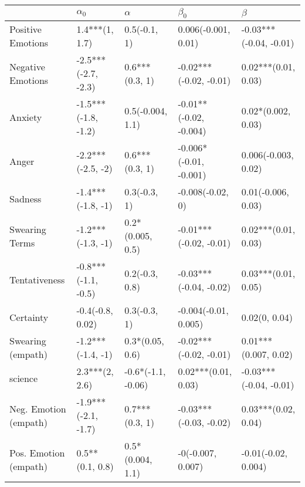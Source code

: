 \begin{tabular}{lllll}
\toprule
{} &           $\alpha_0$ &            $\alpha$ &               $\beta_0$ &                 $\beta$ \\
\midrule
Positive Emotions     &       1.4***(1, 1.7) &        0.5(-0.1, 1) &     0.006(-0.001, 0.01) &  -0.03***(-0.04, -0.01) \\
Negative Emotions     &  -2.5***(-2.7, -2.3) &      0.6***(0.3, 1) &  -0.02***(-0.02, -0.01) &     0.02***(0.01, 0.03) \\
Anxiety               &  -1.5***(-1.8, -1.2) &    0.5(-0.004, 1.1) &  -0.01**(-0.02, -0.004) &      0.02*(0.002, 0.03) \\
Anger                 &    -2.2***(-2.5, -2) &      0.6***(0.3, 1) &  -0.006*(-0.01, -0.001) &     0.006(-0.003, 0.02) \\
Sadness               &    -1.4***(-1.8, -1) &        0.3(-0.3, 1) &        -0.008(-0.02, 0) &      0.01(-0.006, 0.03) \\
Swearing Terms        &    -1.2***(-1.3, -1) &    0.2*(0.005, 0.5) &  -0.01***(-0.02, -0.01) &     0.02***(0.01, 0.03) \\
Tentativeness         &  -0.8***(-1.1, -0.5) &      0.2(-0.3, 0.8) &  -0.03***(-0.04, -0.02) &     0.03***(0.01, 0.05) \\
Certainty             &     -0.4(-0.8, 0.02) &        0.3(-0.3, 1) &    -0.004(-0.01, 0.005) &           0.02(0, 0.04) \\
Swearing (empath)     &    -1.2***(-1.4, -1) &     0.3*(0.05, 0.6) &  -0.02***(-0.02, -0.01) &    0.01***(0.007, 0.02) \\
science               &       2.3***(2, 2.6) &  -0.6*(-1.1, -0.06) &     0.02***(0.01, 0.03) &  -0.03***(-0.04, -0.01) \\
Neg. Emotion (empath) &  -1.9***(-2.1, -1.7) &      0.7***(0.3, 1) &  -0.03***(-0.03, -0.02) &     0.03***(0.02, 0.04) \\
Pos. Emotion (empath) &      0.5**(0.1, 0.8) &    0.5*(0.004, 1.1) &       -0(-0.007, 0.007) &     -0.01(-0.02, 0.004) \\
\bottomrule
\end{tabular}
